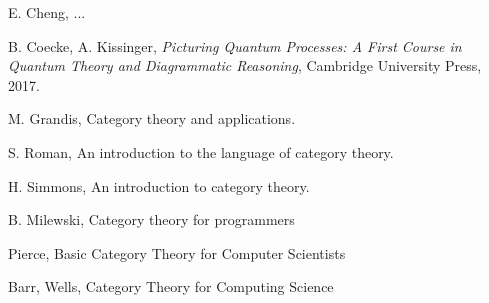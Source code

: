 \documentclass[10pt, article, one side]{memoir}
\begin{document}
    
    



    \begin{thebibliography}{00}

        
        E. Cheng, ... 
        
        B.
        Coecke, A.
        Kissinger,
        \emph{Picturing Quantum Processes: A First Course in Quantum Theory and Diagrammatic Reasoning},
        Cambridge University Press, 2017.

        M.
        Grandis, Category theory and applications.

        S.
        Roman, An introduction to the language of category theory.

        H.
        Simmons, An introduction to category theory.

        B.
        Milewski, Category theory for programmers

         Pierce, Basic Category Theory for Computer Scientists

         Barr, Wells, Category Theory for Computing Science

    \end{thebibliography}
\end{document}
